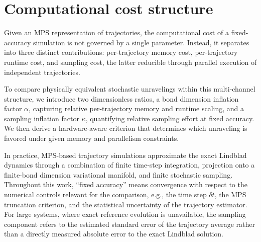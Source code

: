 \documentclass[aps, pra, superscriptaddress, reprint, floatfix]{revtex4-2}
\theoremstyle{plain}
\begin{document}
\section{Computational cost structure}
\label{sec:cost_structure}
Given an MPS representation of trajectories, the computational cost of a fixed-accuracy simulation is not governed by a single parameter. Instead, it separates into three distinct contributions: per-trajectory memory cost, per-trajectory runtime cost, and sampling cost, the latter reducible through parallel execution of independent trajectories.

To compare physically equivalent stochastic unravelings within this multi-channel structure, we introduce two dimensionless ratios, a bond dimension inflation factor $\alpha$, capturing relative per-trajectory memory and runtime scaling, and a sampling inflation factor $\kappa$, quantifying relative sampling effort at fixed accuracy. We then derive a hardware-aware criterion that determines which unraveling is favored under given memory and parallelism constraints.

In practice, MPS-based trajectory simulations approximate the exact Lindblad dynamics through a combination of finite time-step integration, projection onto a finite-bond dimension variational manifold, and finite stochastic sampling. Throughout this work, ``fixed accuracy'' means convergence with respect to the numerical controls relevant for the comparison, e.g., the time step $\delta t$, the MPS truncation criterion, and the statistical uncertainty of the trajectory estimator. For large systems, where exact reference evolution is unavailable, the sampling component refers to the estimated standard error of the trajectory average rather than a directly measured absolute error to the exact Lindblad solution.
\end{document}
